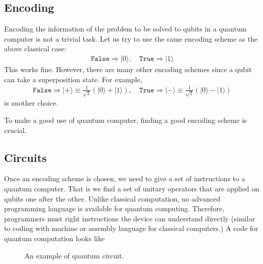 \documentclass[letterpaper,10pt,english]{jupyterBook}
\begin{document}
\subsection{Encoding}
\label{\detokenize{computation/qcomp:encoding}}
\sphinxAtStartPar
Encoding the information of the problem to be solved to qubits in a quantum computer is not a trivial task.  Let us try to use the same encoding scheme as the above classical case:
\begin{equation*}
\begin{split}
\texttt{False} \Rightarrow \lvert 0 \rangle, \quad \texttt{True} \Rightarrow \lvert 1 \rangle
\end{split}
\end{equation*}
\sphinxAtStartPar
This works fine.  However, there are many other encoding schemes since a qubit can take a superposition state.  For example,
\begin{equation*}
\begin{split}
\texttt{False} \Rightarrow \lvert + \rangle \equiv \frac{1}{\sqrt{2}}\left(\lvert 0 \rangle+\lvert 1 \rangle\right), \quad
\texttt{True}  \Rightarrow \lvert - \rangle \equiv \frac{1}{\sqrt{2}}\left(\lvert 0 \rangle-\lvert 1 \rangle\right)
\end{split}
\end{equation*}
\sphinxAtStartPar
is another choice.

\sphinxAtStartPar
To make a good use of quantum computer, finding a good encoding scheme is crucial.


\subsection{Circuits}
\label{\detokenize{computation/qcomp:circuits}}
\sphinxAtStartPar
Once an encoding scheme is chosen, we need to give a set of instructions to a quantum computer.  That is we find a set of unitary operators that are applied on qubits one after the other. Unlike classical computation, no advanced programming language is available for quantum computing.  Therefore, programmers must right  instructions the device can understand directly (similar to coding with machine or assembly language for classical computers.)  A code for quantum computation looks like

\begin{figure}[htbp]
\centering
\capstart

\noindent{}
\caption{An example of quantum circuit.}\label{\detokenize{computation/qcomp:qc-example}}\end{figure}
\end{document}

